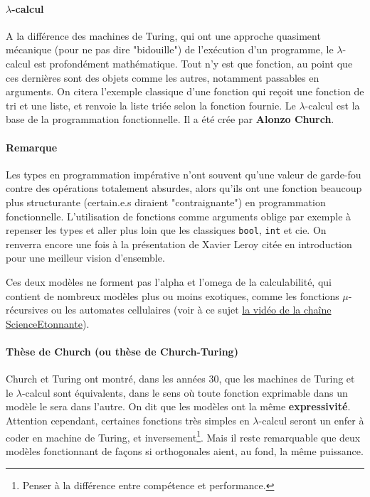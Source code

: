 \paragraph{$\lambda$-calcul} A la différence des machines de Turing, qui ont une approche quasiment mécanique (pour ne pas dire "bidouille") de l'exécution d'un programme, le $\lambda$-calcul est profondément mathématique. Tout n'y est que fonction, au point que ces dernières sont des objets comme les autres, notamment passables en arguments. On citera l'exemple classique d'une fonction qui reçoit une fonction de tri et une liste, et renvoie la liste triée selon la fonction fournie. Le $\lambda$-calcul est la base de la programmation fonctionnelle. Il a été crée par \textbf{Alonzo Church}.

\paragraph{Remarque} Les types en programmation impérative n'ont souvent qu'une valeur de garde-fou contre des opérations totalement absurdes, alors qu'ils ont une fonction beaucoup plus structurante (certain.e.s diraient "contraignante") en programmation fonctionnelle. L'utilisation de fonctions comme arguments oblige par exemple à repenser les types et aller plus loin que les classiques \verb!bool!, \verb!int! et cie. On renverra encore une fois à la présentation de Xavier Leroy citée en introduction pour une meilleur vision d'ensemble.

Ces deux modèles ne forment pas l'alpha et l'omega de la calculabilité, qui contient de nombreux modèles plus ou moins exotiques, comme les fonctions $\mu$-récursives ou les automates cellulaires (voir à ce sujet \href{https://www.youtube.com/watch?v=S-W0NX97DB0}{la vidéo de la chaîne ScienceEtonnante}).

\paragraph{Thèse de Church (ou thèse de Church-Turing)} Church et Turing ont montré, dans les années 30, que les machines de Turing et le $\lambda$-calcul sont équivalents, dans le sens où toute fonction exprimable dans un modèle le sera dans l'autre. On dit que les modèles ont la même \textbf{expressivité}. Attention cependant, certaines fonctions très simples en $\lambda$-calcul seront un enfer à coder en machine de Turing, et inversement\footnote{Penser à la différence entre compétence et performance.}. Mais il reste remarquable que deux modèles fonctionnant de façons si orthogonales aient, au fond, la même puissance. 


